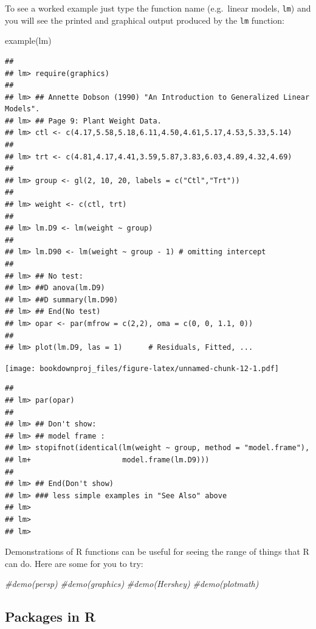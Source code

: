 \documentclass[
]{book}
\newenvironment{Shaded}{\begin{snugshade}}{\end{snugshade}}
\newcommand{\CommentTok}[1]{\textcolor[rgb]{0.56,0.35,0.01}{\textit{#1}}}
\newcommand{\FunctionTok}[1]{\textcolor[rgb]{0.00,0.00,0.00}{#1}}
\newcommand{\NormalTok}[1]{#1}
\theoremstyle{definition}
\theoremstyle{definition}
\theoremstyle{definition}
\theoremstyle{definition}
\theoremstyle{remark}
\begin{document}
To see a worked example just type the function name (e.g.~linear models, \texttt{lm}) and you will see the printed and graphical output produced by the \texttt{lm} function:

\begin{Shaded}
\begin{Highlighting}[]
\FunctionTok{example}\NormalTok{(lm)}
\end{Highlighting}
\end{Shaded}

\begin{verbatim}
## 
## lm> require(graphics)
## 
## lm> ## Annette Dobson (1990) "An Introduction to Generalized Linear Models".
## lm> ## Page 9: Plant Weight Data.
## lm> ctl <- c(4.17,5.58,5.18,6.11,4.50,4.61,5.17,4.53,5.33,5.14)
## 
## lm> trt <- c(4.81,4.17,4.41,3.59,5.87,3.83,6.03,4.89,4.32,4.69)
## 
## lm> group <- gl(2, 10, 20, labels = c("Ctl","Trt"))
## 
## lm> weight <- c(ctl, trt)
## 
## lm> lm.D9 <- lm(weight ~ group)
## 
## lm> lm.D90 <- lm(weight ~ group - 1) # omitting intercept
## 
## lm> ## No test: 
## lm> ##D anova(lm.D9)
## lm> ##D summary(lm.D90)
## lm> ## End(No test)
## lm> opar <- par(mfrow = c(2,2), oma = c(0, 0, 1.1, 0))
## 
## lm> plot(lm.D9, las = 1)      # Residuals, Fitted, ...
\end{verbatim}

\texttt{[image: bookdownproj\_files/figure-latex/unnamed-chunk-12-1.pdf]}

\begin{verbatim}
## 
## lm> par(opar)
## 
## lm> ## Don't show: 
## lm> ## model frame :
## lm> stopifnot(identical(lm(weight ~ group, method = "model.frame"),
## lm+                     model.frame(lm.D9)))
## 
## lm> ## End(Don't show)
## lm> ### less simple examples in "See Also" above
## lm> 
## lm> 
## lm>
\end{verbatim}

Demonstrations of R functions can be useful for seeing the range of things that R can do. Here are some for you to try:

\begin{Shaded}
\begin{Highlighting}[]
\CommentTok{\#demo(persp)}
\CommentTok{\#demo(graphics)}
\CommentTok{\#demo(Hershey)}
\CommentTok{\#demo(plotmath)}
\end{Highlighting}
\end{Shaded}

\hypertarget{packages-in-r}{%
\subsection{Packages in R}\label{packages-in-r}}
\end{document}
